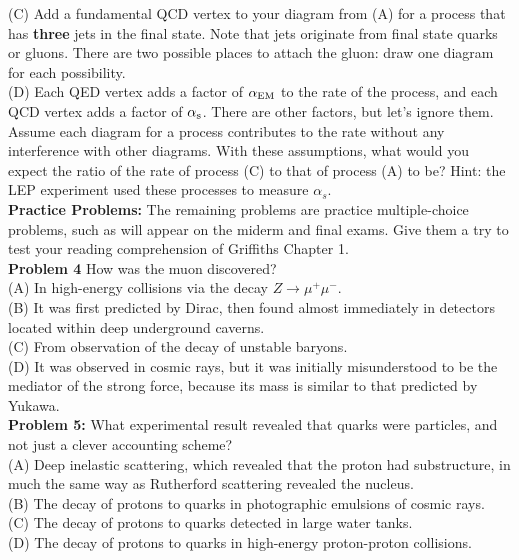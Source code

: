\documentclass[12pt]{article}
\begin{document}
\noindent
(C) Add a fundamental QCD vertex to your diagram from (A) for a
process that has {\bf three} jets in the final state.  Note that jets
originate from final state quarks or gluons.  There are two possible
places to attach the gluon: draw one diagram for each
possibility.\\[3pt]

\noindent
(D) Each QED vertex adds a factor of $\alpha_{\rm EM}$ to the rate of
the process, and each QCD vertex adds a factor of $\alpha_{\rm s}$.
There are other factors, but let's ignore them.  Assume each diagram
for a process contributes to the rate without any interference with
other diagrams.  With these assumptions, what would you expect the
ratio of the rate of process (C) to that of process (A) to be?  Hint:
the LEP experiment used these processes to measure $\alpha_s$.\\[3pt]

\noindent
{\bf Practice Problems:} The remaining problems are practice
multiple-choice problems, such as will appear on the miderm and final
exams.  Give them a try to test your reading comprehension of
Griffiths Chapter 1.\\[3pt]

\noindent
{\bf Problem 4}  How was the muon discovered?\\[5pt]
(A) In high-energy collisions via the decay $Z \to \mu^+ \mu^-$.\\[3pt]
(B) It was first predicted by Dirac, then found almost immediately in
detectors located within deep underground caverns.\\[3pt]
(C) From observation of the decay of unstable baryons.\\[3pt]
(D) It was observed in cosmic rays, but it was initially misunderstood
to be the mediator of the strong force, because its mass is similar to that predicted by Yukawa.\\[3pt]

\noindent
{\bf Problem 5:}  What experimental result revealed that quarks were particles, and not just a clever accounting scheme?\\[5pt]
(A) Deep inelastic scattering, which revealed that the proton had substructure, in much the same way as Rutherford scattering revealed the nucleus.\\[3pt]
(B) The decay of protons to quarks in photographic emulsions of cosmic rays.\\[3pt]
(C) The decay of protons to quarks detected in large water tanks.\\[3pt]
(D) The decay of protons to quarks in high-energy proton-proton collisions.\\[5pt]
\end{document}
